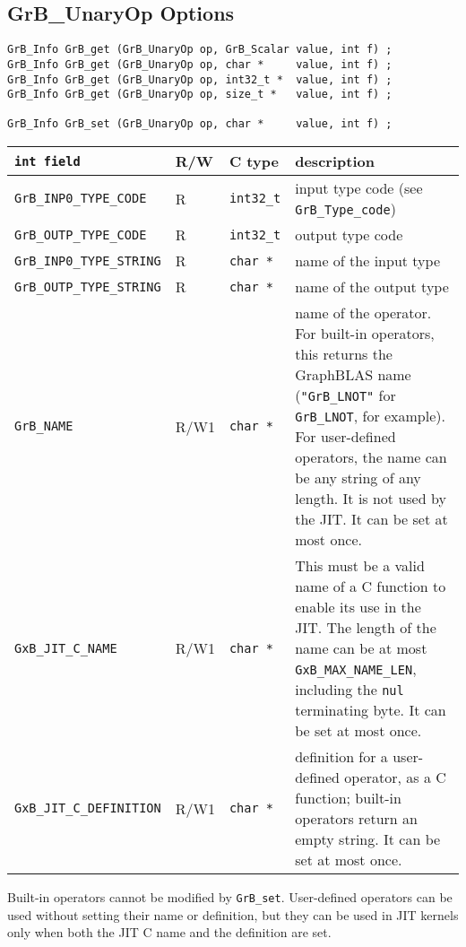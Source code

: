
\newpage
\subsection{{\sf GrB\_UnaryOp} Options}
\label{get_set_unop}

\begin{mdframed}[userdefinedwidth=6in]
{\footnotesize
\begin{verbatim}
GrB_Info GrB_get (GrB_UnaryOp op, GrB_Scalar value, int f) ;
GrB_Info GrB_get (GrB_UnaryOp op, char *     value, int f) ;
GrB_Info GrB_get (GrB_UnaryOp op, int32_t *  value, int f) ;
GrB_Info GrB_get (GrB_UnaryOp op, size_t *   value, int f) ;

GrB_Info GrB_set (GrB_UnaryOp op, char *     value, int f) ;
\end{verbatim}
}\end{mdframed}

\noindent
{\small
\begin{tabular}{|l|l|l|p{2.8in}|}
\hline
\verb'int field'                    & R/W  & C type        & description \\
\hline
\verb'GrB_INP0_TYPE_CODE'          & R    & \verb'int32_t'& input type code (see \verb'GrB_Type_code') \\
\verb'GrB_OUTP_TYPE_CODE'          & R    & \verb'int32_t'& output type code \\
\verb'GrB_INP0_TYPE_STRING'        & R    & \verb'char *' & name of the input type \\
\verb'GrB_OUTP_TYPE_STRING'        & R    & \verb'char *' & name of the output type \\
\hline
\verb'GrB_NAME'                     & R/W1 & \verb'char *' &    %
    name of the operator.  For built-in operators, this returns the GraphBLAS
    name (\verb'"GrB_LNOT"' for \verb'GrB_LNOT', for example).
    For user-defined operators, the name can be any string of any length.  It
    is not used by the JIT.  It can be set at most once. \\
\verb'GxB_JIT_C_NAME'               & R/W1 & \verb'char *' &
    This must be a valid name of a C function to enable its use in the JIT.
    The length of the name can be at most \verb'GxB_MAX_NAME_LEN', including
    the \verb'nul' terminating byte.  It can be set at most once. \\
\verb'GxB_JIT_C_DEFINITION'         & R/W1 & \verb'char *' &
    definition for a user-defined operator, as a C function; built-in operators
    return an empty string.  It can be set at most once. \\
\hline
\end{tabular}
}

Built-in operators cannot be modified by \verb'GrB_set'.  User-defined
operators can be used without setting their name or definition, but they can be
used in JIT kernels only when both the JIT C name and the definition are set.

